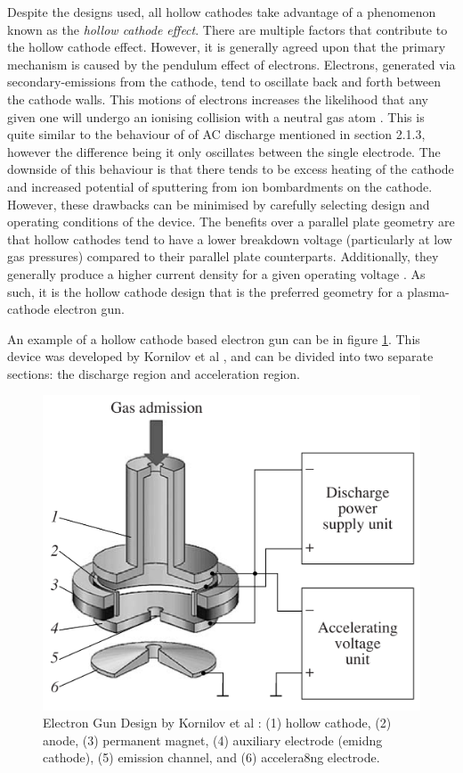 Despite the designs used, all hollow cathodes take advantage of a phenomenon known as the \textit{hollow cathode effect}. There are multiple factors that contribute to the hollow cathode effect. However, it is generally agreed upon that the primary mechanism is caused by the pendulum effect of electrons. Electrons, generated via secondary-emissions from the cathode, tend to oscillate back and forth between the cathode walls. This motions of electrons increases the likelihood that any given one will undergo an ionising collision with a neutral gas atom \cite{Arslanbekov1998}. This is quite similar to the behaviour of of AC discharge mentioned in section 2.1.3, however the difference being it only oscillates between the single electrode. The downside of this behaviour is that there tends to be excess heating of the cathode and increased potential of sputtering from ion bombardments on the cathode. However, these drawbacks can be minimised by carefully selecting design and operating conditions of the device. The benefits over a parallel plate geometry are that hollow cathodes tend to have a lower breakdown voltage (particularly at low gas pressures) \cite{Kolobov2015, Eichhorn1993} compared to their parallel plate counterparts. Additionally, they generally produce a higher current density for a given operating voltage \cite{Kolobov2015, Pillow1981}. As such, it is the hollow cathode design that is the preferred geometry for a plasma-cathode electron gun.

An example of a hollow cathode based electron gun can be in figure \ref{fig:kornilov_device}. This device was developed by Kornilov et al \cite{Kornilov2009}, and can be divided into two separate sections: the discharge region and acceleration region. 

\begin{figure}[h!]
	\centering
	\includegraphics[width=0.6\linewidth]{background/figures/kornilov_device.png}
	\caption{Electron Gun Design by Kornilov et al \cite{Kornilov2009}: (1) hollow cathode, (2) anode, (3) permanent magnet, (4) auxiliary electrode (emidng cathode), (5) emission channel, and (6) accelera8ng electrode.}
	\label{fig:kornilov_device}
\end{figure}


